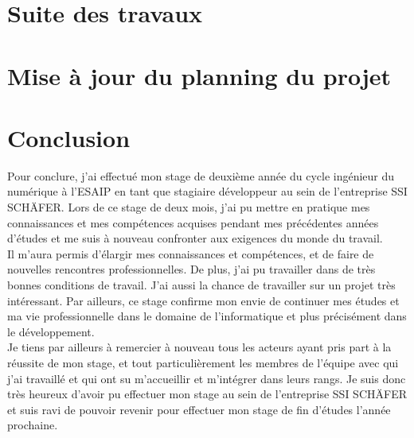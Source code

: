 \documentclass[a4paper, 12pt, french]{article}
\begin{document}
	
	\newpage

	\section{Suite des travaux}
		
	\newpage

	\section{Mise à jour du planning du projet}

	\newpage
	
	\section*{Conclusion}
	Pour conclure, j'ai effectué mon stage de deuxième année du cycle ingénieur du numérique à l'ESAIP en tant que stagiaire développeur au sein de l'entreprise SSI SCHÄFER. Lors de ce stage de deux mois, j'ai pu mettre en pratique mes connaissances et mes compétences acquises pendant mes précédentes années d’études et me suis à nouveau confronter aux exigences du monde du travail.\\


	Il m’aura permis d’élargir mes connaissances et compétences, et de faire de nouvelles rencontres professionnelles. De plus, j’ai pu travailler dans de très bonnes conditions de travail. J’ai aussi la chance de travailler sur un projet très intéressant. Par ailleurs, ce stage confirme mon envie de continuer mes études et ma vie professionnelle dans le domaine de l’informatique et plus précisément dans le développement.\\

	Je tiens par ailleurs à remercier à nouveau tous les acteurs ayant pris part à la réussite de mon stage, et tout particulièrement les membres de l’équipe avec qui j’ai travaillé et qui ont su m’accueillir et m’intégrer dans leurs rangs. Je suis donc très heureux d’avoir pu effectuer mon stage au sein de l'entreprise SSI SCHÄFER et suis ravi de pouvoir revenir pour effectuer mon stage de fin d'études l'année prochaine.
   

	\newpage

	\appendix%
\end{document}
